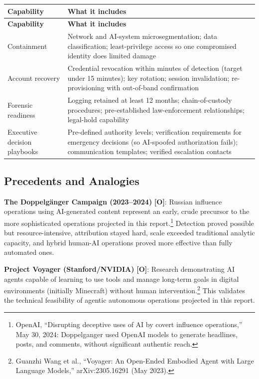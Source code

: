 \documentclass[11pt,letterpaper]{article}
\begin{document}
{\small
\begin{longtable}{L{3.2cm}L{9.6cm}}
\toprule
\textbf{Capability} & \textbf{What it includes} \\
\midrule
\endfirsthead
\toprule
\textbf{Capability} & \textbf{What it includes} \\
\midrule
\endhead
Containment & Network and AI-system microsegmentation; data classification; least-privilege access so one compromised identity does limited damage \\*
Account recovery & Credential revocation within minutes of detection (target under 15 minutes); key rotation; session invalidation; re-provisioning with out-of-band confirmation \\
Forensic readiness & Logging retained at least 12 months; chain-of-custody procedures; pre-established law-enforcement relationships; legal-hold capability \\*
Executive decision playbooks & Pre-defined authority levels; verification requirements for emergency decisions (so AI-spoofed authorization fails); communication templates; verified escalation contacts \\
\bottomrule
\end{longtable}}

\subsection{Precedents and Analogies}

\textbf{The Doppelg\"anger Campaign (2023--2024)} \textbf{[O]}: Russian influence operations using AI-generated content represent an early, crude precursor to the more sophisticated operations projected in this report.\footnote{OpenAI, ``Disrupting deceptive uses of AI by covert influence operations,'' May 30, 2024: Doppelganger used OpenAI models to generate headlines, posts, and comments, without significant authentic reach.} Detection proved possible but resource-intensive, attribution stayed hard, scale exceeded traditional analytic capacity, and hybrid human-AI operations proved more effective than fully automated ones.

\textbf{Project Voyager (Stanford/NVIDIA)} \textbf{[O]}: Research demonstrating AI agents capable of learning to use tools and manage long-term goals in digital environments (initially Minecraft) without human intervention.\footnote{Guanzhi Wang et al., ``Voyager: An Open-Ended Embodied Agent with Large Language Models,'' arXiv:2305.16291 (May 2023).} This validates the technical feasibility of agentic autonomous operations projected in this report.
\end{document}
